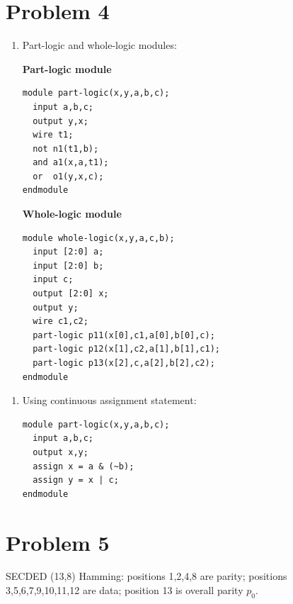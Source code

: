 \documentclass[11pt]{article}
\begin{document}
\section*{Problem 4}
\noindent%
\begin{minipage}[t]{0.48\linewidth}
  \begin{enumerate}[label=(\alph*)]
    \item Part-logic and whole-logic modules:

    \textbf{Part-logic module}

    \begin{lstlisting}[style=verilog]
module part-logic(x,y,a,b,c);
  input a,b,c;
  output y,x;
  wire t1;
  not n1(t1,b);
  and a1(x,a,t1);
  or  o1(y,x,c);
endmodule
    \end{lstlisting}

    \textbf{Whole-logic module}

    \begin{lstlisting}[style=verilog]
module whole-logic(x,y,a,c,b);
  input [2:0] a;
  input [2:0] b;
  input c;
  output [2:0] x;
  output y;
  wire c1,c2;
  part-logic p11(x[0],c1,a[0],b[0],c);
  part-logic p12(x[1],c2,a[1],b[1],c1);
  part-logic p13(x[2],c,a[2],b[2],c2);
endmodule
    \end{lstlisting}
  \end{enumerate}
\end{minipage}%
\hfill%
\begin{minipage}[t]{0.48\linewidth}
  \begin{enumerate}[label=(\alph*),start=2]
    \item Using continuous assignment statement:

    \begin{lstlisting}[style=verilog]
module part-logic(x,y,a,b,c);
  input a,b,c;
  output x,y;
  assign x = a & (~b);
  assign y = x | c;
endmodule
    \end{lstlisting}
  \end{enumerate}
\end{minipage}

\section*{Problem 5}
SECDED (13,8) Hamming: positions 1,2,4,8 are parity; positions 3,5,6,7,9,10,11,12 are data; position 13 is overall parity $p_0$.
\end{document}
